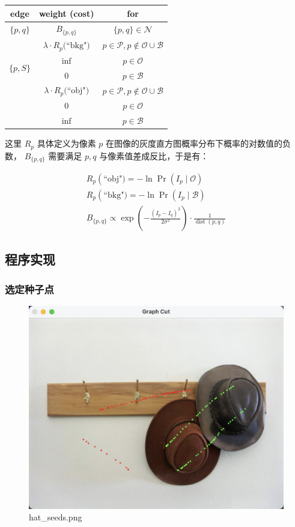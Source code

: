 \documentclass[lang=cn,11pt,a4paper]{elegantpaper}
\begin{document}
\begin{center}
\begin{tabular}{|c|c|c|}
\hline \textbf{edge} & \textbf{weight (cost)} & \textbf{for} \\
\hline \hline$\{p, q\}$ & $B_{\{p, q\}}$ & $\{p, q\} \in \mathcal{N}$ \\
\hline \multirow{4}{*}{$\{p, S\}$} & $\lambda \cdot R_{p}\text{(``bkg")}$ & $p \in \mathcal{P}, p \notin \mathcal{O} \cup \mathcal{B}$ \\
\cline { 2 - 3 } & $\text{inf}$ & $p \in \mathcal{O}$ \\
\cline { 2 - 3 } & 0 & $p \in \mathcal{B}$ \\
\hline \multirow{4}{*}{$\{p, T\}$} & $\lambda \cdot R_{p}\text{(``obj")}$ & $p \in \mathcal{P}, p \notin \mathcal{O} \cup \mathcal{B}$ \\
\cline { 2 - 3 } & 0 & $p \in \mathcal{O}$ \\
\cline { 2 - 3 } & $\text{inf}$ & $p \in \mathcal{B}$ \\
\hline
\end{tabular}
\end{center}

这里 $R_{p}$ 具体定义为像素 $p$ 在图像的灰度直方图概率分布下概率的对数值的负数， $B_{\{p, q\}}$  需要满足 $p, q$ 与像素值差成反比，于是有：

$$
\begin{array}{l}
R_{p}\left(\text{``obj"}) = -\ln \operatorname{Pr}\left(I_{p} \mid \mathcal{O}\right)\right. \\
R_{p}\left(\text{``bkg"}) = -\ln \operatorname{Pr}\left(I_{p} \mid \mathcal{B}\right) \right. \\
B_{\{p, q\}} \propto \exp \left(-\frac{\left(I_{p}-I_{q}\right)^{2}}{2 \sigma^{2}}\right) \cdot \frac{1}{\operatorname{dist}(p, q)}
\end{array}
$$

\subsection{程序实现}

\subsubsection{选定种子点}

\begin{figure}[ht]
	\centering
	\includegraphics[width=0.5\linewidth]{image/hat_seeds.png}
	\caption{hat\_seeds.png}
\end{figure}
\end{document}
